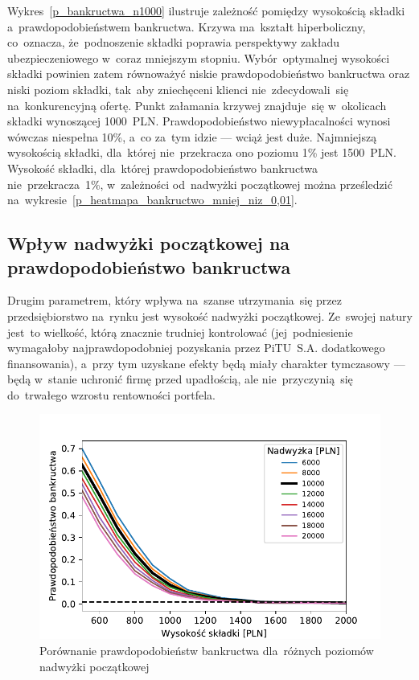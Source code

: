 \documentclass[12pt, a4paper, oneside]{mwart} %
\begin{document}
Wykres~\ref{p_bankructwa_n1000} ilustruje zależność pomiędzy wysokością składki a~prawdopodobieństwem bankructwa. Krzywa ma~kształt hiperboliczny, co~oznacza, że~podnoszenie składki poprawia perspektywy zakładu ubezpieczeniowego w~coraz mniejszym stopniu. Wybór~optymalnej wysokości składki powinien zatem równoważyć niskie prawdopodobieństwo bankructwa oraz niski poziom składki, tak~aby zniechęceni klienci nie~zdecydowali~się na~konkurencyjną ofertę. Punkt załamania krzywej znajduje~się w~okolicach składki wynoszącej 1000~PLN. Prawdopodobieństwo niewypłacalności wynosi wówczas niespełna 10\%, a~co za~tym idzie --- wciąż jest duże. Najmniejszą wysokością składki, dla~której nie~przekracza ono poziomu 1\% jest 1500~PLN. Wysokość składki, dla~której prawdopodobieństwo bankructwa nie~przekracza~1\%, w~zależności od~nadwyżki początkowej można prześledzić na~wykresie~\ref{p_heatmapa_bankructwo_mniej_niz_0,01}.

\subsection{Wpływ nadwyżki początkowej na prawdopodobieństwo bankructwa}
Drugim parametrem, który wpływa na~szanse utrzymania~się przez przedsiębiorstwo na~rynku jest wysokość nadwyżki początkowej. Ze~swojej natury jest~to wielkość, którą znacznie trudniej kontrolować (jej~podniesienie wymagałoby najprawdopodobniej pozyskania przez PiTU~S.A. dodatkowego finansowania), a~przy tym uzyskane efekty będą miały charakter tymczasowy --- będą w~stanie uchronić firmę przed upadłością, ale nie~przyczynią~się do~trwałego wzrostu rentowności portfela.

\begin{figure}
\centering
\caption{Porównanie prawdopodobieństw bankructwa dla~różnych poziomów nadwyżki początkowej}
\label{p_bankructwa_porownanie_n1000}
\includegraphics[width = \textwidth]{wykresy/p_bankructwa_porownanie.pdf}
\end{figure}
\end{document}
